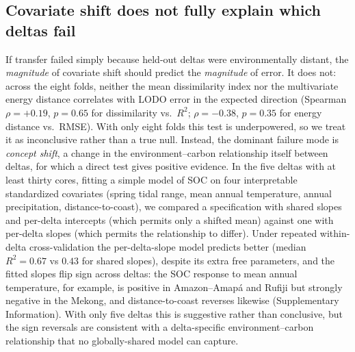 \documentclass[11pt]{article}
\begin{document}
\subsection{Covariate shift does not fully explain which deltas fail}
If transfer failed simply because held-out deltas were environmentally distant, the
\emph{magnitude} of covariate shift should predict the \emph{magnitude} of error. It
does not: across the eight folds, neither the mean dissimilarity index nor the
multivariate energy distance correlates with LODO error in the expected direction
(Spearman $\rho=+0.19$, $p=0.65$ for dissimilarity vs.\ $R^2$; $\rho=-0.38$, $p=0.35$
for energy distance vs.\ RMSE). With only eight folds this test is underpowered, so we
treat it as inconclusive rather than a true null. Instead, the dominant failure mode is
\emph{concept shift}, a change in the environment--carbon relationship itself between
deltas, for which a direct test gives positive evidence. In the five deltas with at least
thirty cores, fitting a simple model of SOC on four interpretable standardized covariates
(spring tidal range, mean annual temperature, annual precipitation, distance-to-coast),
we compared a specification with shared slopes and per-delta intercepts (which permits
only a shifted mean) against one with per-delta slopes (which permits the relationship to
differ). Under repeated within-delta cross-validation the per-delta-slope model predicts
better (median $R^2=0.67$ vs $0.43$ for shared slopes), despite its extra free parameters,
and the fitted slopes flip sign across deltas: the SOC response to mean annual
temperature, for example, is positive in Amazon--Amap\'a and Rufiji but strongly negative
in the Mekong, and distance-to-coast reverses likewise (Supplementary Information). With
only five deltas this is suggestive rather than conclusive, but the sign reversals are
consistent with a delta-specific environment--carbon relationship that no globally-shared
model can capture.
\end{document}
